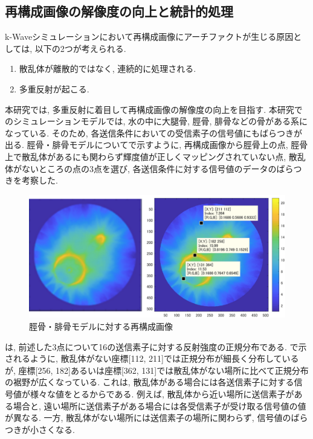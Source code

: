 \subsection{再構成画像の解像度の向上と統計的処理}
k-Waveシミュレーションにおいて再構成画像にアーチファクトが生じる原因としては, 以下の2つが考えられる. 
\begin{enumerate}
\item 散乱体が離散的ではなく, 連続的に処理される. 
\item 多重反射が起こる.  
\end{enumerate}
本研究では, 多重反射に着目して再構成画像の解像度の向上を目指す. 本研究でのシミュレーションモデルでは, 水の中に大腿骨, 脛骨, 腓骨などの骨がある系になっている. そのため, 各送信条件においての受信素子の信号値にもばらつきが出る. 脛骨・腓骨モデルについてで示すように, 再構成画像から脛骨上の点, 脛骨上で散乱体があるにも関わらず輝度値が正しくマッピングされていない点, 散乱体がないところの点の3点を選び, 各送信条件に対する信号値のデータのばらつきを考察した.
\begin{figure}[H]
  \begin{center}
    \includegraphics[width=140mm]{fig/hikotsusaikousei.pdf}
  \end{center}
  \caption{脛骨・腓骨モデルに対する再構成画像}
\end{figure}
は, 前述した3点について16の送信素子に対する反射強度の正規分布である. で示されるように, 散乱体がない座標[112, 211]では正規分布が細長く分布しているが, 座標[256, 182]あるいは座標[362, 131]では散乱体がない場所に比べて正規分布の裾野が広くなっている. これは, 散乱体がある場合には各送信素子に対する信号値が様々な値をとるからである. 例えば, 散乱体から近い場所に送信素子がある場合と, 遠い場所に送信素子がある場合には各受信素子が受け取る信号値の値が異なる. 一方, 散乱体がない場所には送信素子の場所に関わらず, 信号値のばらつきが小さくなる. 
